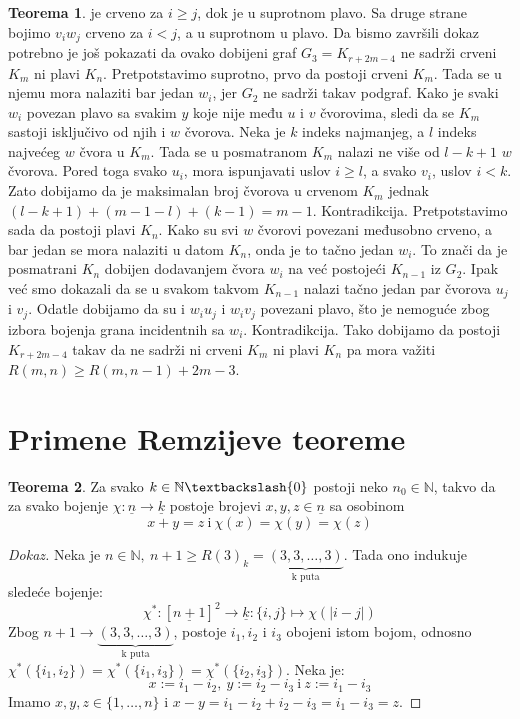 \documentclass{article}
\theoremstyle{definition}
\newtheorem{teorema}{Teorema}[section]
\newcommand{\dokaz}[1]{\begin{proof}[Dokaz]#1\end{proof}}
\begin{document}
\begin{teorema}
{			je crveno za $i \geq j$, dok je u suprotnom plavo. Sa druge strane bojimo $v_i w_j$ crveno za $i < j$, a u suprotnom u plavo. Da bismo završili
			dokaz potrebno je još pokazati da ovako dobijeni graf $G_3 = K_{r + 2m - 4}$ ne sadrži crveni $K_m$ ni plavi $K_n$. \newline
			Pretpotstavimo suprotno, prvo da postoji crveni $K_m$. Tada se u njemu mora nalaziti bar jedan $w_i$, jer $G_2$ ne sadrži takav podgraf. Kako 			je svaki $w_i$ povezan plavo sa svakim $y$ koje nije među $u$ i $v$ čvorovima, sledi da se $K_m$ sastoji isključivo od njih i $w$ čvorova. Neka je
			$k$ indeks najmanjeg, a $l$ indeks najvećeg $w$ čvora u $K_m$. Tada se u posmatranom $K_m$ nalazi ne više od $l - k + 1$ $w$ čvorova.
			Pored toga svako $u_i$, mora ispunjavati uslov $i \geq l$, a svako $v_i$, uslov $i < k$. Zato dobijamo da je maksimalan broj čvorova u crvenom
			$K_m$ jednak $(l - k + 1) + (m - 1 - l) + (k - 1) = m - 1$. Kontradikcija. \newline
			Pretpotstavimo sada da postoji plavi $K_n$. Kako su svi $w$ čvorovi povezani međusobno crveno, a bar jedan se mora nalaziti u datom $K_n$, 
			onda je to tačno jedan $w_i$. To znači da je posmatrani $K_n$ dobijen dodavanjem čvora $w_i$ na već postojeći $K_{n - 1}$ iz $G_2$. Ipak
			već smo dokazali da se u svakom takvom $K_{n - 1}$ nalazi tačno jedan par čvorova $u_j$ i $v_j$. Odatle dobijamo da su i $w_i u_j$ i $w_i v_j$
			povezani plavo, što je nemoguće zbog izbora bojenja grana incidentnih sa $w_i$. Kontradikcija. \newline
			Tako dobijamo da postoji $K_{r + 2m - 4}$ takav da ne sadrži ni crveni $K_m$ ni plavi $K_n$ pa mora važiti $R(m,n) \geq R(m,n-1) + 2m - 3$.
		}
	\end{teorema}
	
	
	\section{Primene Remzijeve teoreme}
	\begin{teorema}\label{sur}
		Za svako $k \in \mathbb{N}\textbackslash \{0\}$  postoji neko $n_{0} \in \mathbb{N}$, takvo da za svako bojenje $\chi:\underline{n} \rightarrow \underline{k}$ postoje brojevi $x, y, z \in \underline{n}$ sa osobinom 
		\[
		x + y = z \: \mathrm{i} \: \chi(x)= \chi(y)=\chi(z)
		\]
	\end{teorema}
	\dokaz{
		Neka je $n \in \mathbb{N},\: n+1 \geq R(3)_k=\underbrace{(3,3,\ldots,3)}_\text{k puta}$. Tada ono indukuje sledeće bojenje:
		\[
		\chi^*:[\underline{n+1}]^2\rightarrow \underline{k}:\{i,j\}\mapsto \chi(|i-j|)
		\]
		Zbog $n+1 \rightarrow \underbrace{(3,3,\ldots,3)}_\text{k puta}$, postoje $i_1, i_2$ i $i_3$ obojeni istom bojom, odnosno $\chi^*(\{i_1,i_2\})=\chi^*(\{i_1,i_3\})=\chi^*(\{i_2,i_3\})$. Neka je:
		\[
		x:=i_1-i_2,\:y:=i_2-i_3\:\mathrm{i}\:z:=i_1-i_3
		\]
		Imamo $x,y,z\in \{1,\ldots,n\}$ i $x-y=i_1-i_2+i_2-i_3=i_1-i_3=z$.
	}
	
\end{document}
